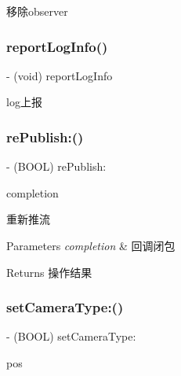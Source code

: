 移除observer \mbox{\label{interface_c_c_streamer_basic_ad2772456b583a89888dba4f3157482a9}} 
\subsubsection{\texorpdfstring{report\+Log\+Info()}{reportLogInfo()}}
{\footnotesize\ttfamily -\/ (void) report\+Log\+Info \begin{DoxyParamCaption}{ }\end{DoxyParamCaption}}

log上报 \mbox{\label{interface_c_c_streamer_basic_ada5f0d8268f6a10829e0784ded531b78}} 
\subsubsection{\texorpdfstring{re\+Publish\+:()}{rePublish:()}}
{\footnotesize\ttfamily -\/ (B\+O\+OL) re\+Publish\+: \begin{DoxyParamCaption}\item[{(C\+C\+Comletion\+Block)}]{completion }\end{DoxyParamCaption}}

重新推流 
\begin{DoxyParams}{Parameters}
{\em completion} & 回调闭包 \\
\hline
\end{DoxyParams}
\begin{DoxyReturn}{Returns}
操作结果 
\end{DoxyReturn}
\mbox{\label{interface_c_c_streamer_basic_a6f342af6416873ec1608a4f270cec09e}} 
\subsubsection{\texorpdfstring{set\+Camera\+Type\+:()}{setCameraType:()}}
{\footnotesize\ttfamily -\/ (B\+O\+OL) set\+Camera\+Type\+: \begin{DoxyParamCaption}\item[{(A\+V\+Capture\+Device\+Position)}]{pos }\end{DoxyParamCaption}}

